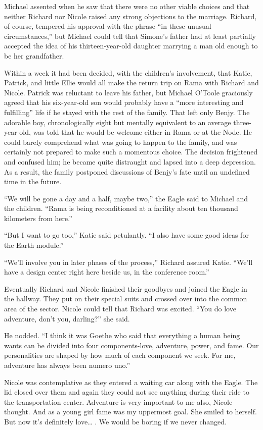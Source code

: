 \documentclass[]{article}
\begin{document}
{Michael assented when he saw that there were no other viable choices and that neither Richard nor Nicole raised any strong objections to the marriage.  Richard, of course, tempered his approval with the phrase “in these unusual circumstances,” but Michael could tell that Simone’s father had at least partially accepted the idea of his thirteen-year-old daughter marrying a man old enough to be her grandfather.

Within a week it had been decided, with the children’s involvement, that Katie, Patrick, and little Ellie would all make the return trip on Rama with Richard and Nicole.  Patrick was reluctant to leave his father, but Michael O’Toole graciously agreed that his six-year-old son would probably have a “more interesting and fulfilling” life if he stayed with the rest of the family.  That left only Benjy.  The adorable boy, chronologically eight but mentally equivalent to an average three-year-old, was told that he would be welcome either in Rama or at the Node.  He could barely comprehend what was going to happen to the family, and was certainly not prepared to make such a momentous choice.  The decision frightened and confused him; he became quite distraught and lapsed into a deep depression.  As a result, the family postponed discussions of Benjy’s fate until an undefined time in the future.

“We will be gone a day and a half, maybe two,” the Eagle said to Michael and the children.  “Rama is being reconditioned at a facility about ten thousand kilometers from here.”

“But I want to go too,” Katie said petulantly.  “I also have some good ideas for the Earth module.”

“We’ll involve you in later phases of the process,” Richard assured Katie.  “We’ll have a design center right here beside us, in the conference room.”

Eventually Richard and Nicole finished their goodbyes and joined the Eagle in the hallway.  They put on their special suits and crossed over into the common area of the sector.  Nicole could tell that Richard was excited.  “You do love adventure, don’t you, darling?” she said.

He nodded.  “I think it was Goethe who said that everything a human being wants can be divided into four components-love, adventure, power, and fame.  Our personalities are shaped by how much of each component we seek.  For me, adventure has always been numero uno.”

Nicole was contemplative as they entered a waiting car along with the Eagle.  The lid closed over them and again they could not see anything during their ride to the transportation center.  Adventure is very important to me also, Nicole thought.  And as a young girl fame was my uppermost goal.  She smiled to herself.  But now it’s definitely love… .  We would be boring if we never changed.

}
\end{document}
